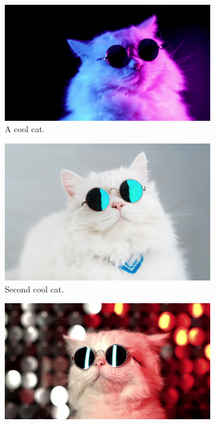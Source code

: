 \documentclass{article}
\begin{document}
\begin{figure}[h!]
\begin{subfigure}[b]{0.3\linewidth}
	\includegraphics[width=\linewidth]{cool_cat.jpg}
	\caption{A cool cat.}
\end{subfigure}
\begin{subfigure}[b]{0.3\linewidth}
	\includegraphics[width=\linewidth]{another_cool_cat.jpg}
	\caption{Second cool cat.}
\end{subfigure}
\begin{subfigure}[b]{0.3\linewidth}
	\includegraphics[width=\linewidth]{third_cool_cat.jpg}

\end{subfigure}
\end{figure}
\end{document}
